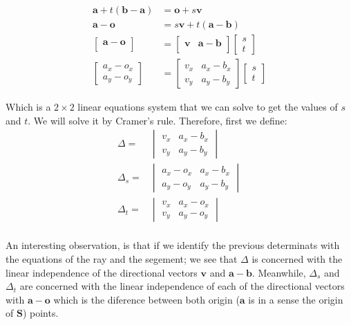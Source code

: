 \begin{align*}
\mathbf{a} + t (\mathbf{b} - \mathbf{a}) &= \mathbf{o} + s \mathbf{v} \\
\mathbf{a} - \mathbf{o} &= s \mathbf{v} + t (\mathbf{a} - \mathbf{b}) \\
\begin{bmatrix}
\mathbf{a} - \mathbf{o}  \\
 ~ 
\end{bmatrix} &= 
\begin{bmatrix}
\mathbf{v} & \mathbf{a} - \mathbf{b} \\
~ & ~
\end{bmatrix}
\begin{bmatrix}
s \\
t 
\end{bmatrix} \\
\begin{bmatrix}
a_x - o_x  \\
a_y - o_y
\end{bmatrix} &= 
\begin{bmatrix}
v_x & a_x - b_x \\
v_y & a_y - b_y
\end{bmatrix}
\begin{bmatrix}
s \\
t 
\end{bmatrix}
\end{align*}

Which is a $2 \times 2$ linear equations system that we can solve to get the values of $s$ and $t$.
We will solve it by Cramer's rule. 
Therefore, first we define:
\begin{align*}
\Delta =&  
\begin{vmatrix}
v_x & a_x - b_x \\
v_y & a_y - b_y
\end{vmatrix} \\
\Delta_s =&  
\begin{vmatrix}
a_x - o_x & a_x - b_x \\
a_y - o_y & a_y - b_y
\end{vmatrix} \\
\Delta_t =&  
\begin{vmatrix}
v_x & a_x - o_x \\
v_y & a_y - o_y
\end{vmatrix} \\
\end{align*}

An interesting observation, is that if we identify the previous determinats with the equations of the ray and the segement; 
we see that $\Delta$ is  concerned with the linear independence of the directional vectors $\mathbf{v}$ and $\mathbf{a} - \mathbf{b}$.
Meanwhile, $\Delta_s$ and $\Delta_t$ are concerned with the linear independence of each of the directional vectors with $\mathbf{a} - \mathbf{o}$ which is the diference between both origin ($\mathbf{a}$ is in a sense the origin of $\mathbf{S}$) points.

